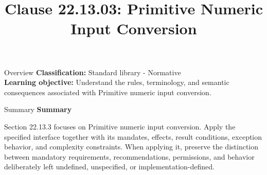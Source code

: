 \documentclass[10pt,letterpaper]{article}
\title{Clause 22.13.03: Primitive Numeric Input Conversion}
\author{}
\date{}
\begin{document}
\maketitle
\begin{CornellOverviewBox}{Overview}
\textbf{Classification:} Standard library - Normative\\[2pt]
\textbf{Learning objective:} Understand the rules, terminology, and semantic consequences associated with Primitive numeric input conversion.
\end{CornellOverviewBox}\begin{CornellSummaryBox}{Summary}
{\sffamily\bfseries\color{Accent} Summary}\par\vspace{3pt}Section 22.13.3 focuses on Primitive numeric input conversion. Apply the specified interface together with its mandates, effects, result conditions, exception behavior, and complexity constraints. When applying it, preserve the distinction between mandatory requirements, recommendations, permissions, and behavior deliberately left undefined, unspecified, or implementation-defined.
\end{CornellSummaryBox}
\end{document}
